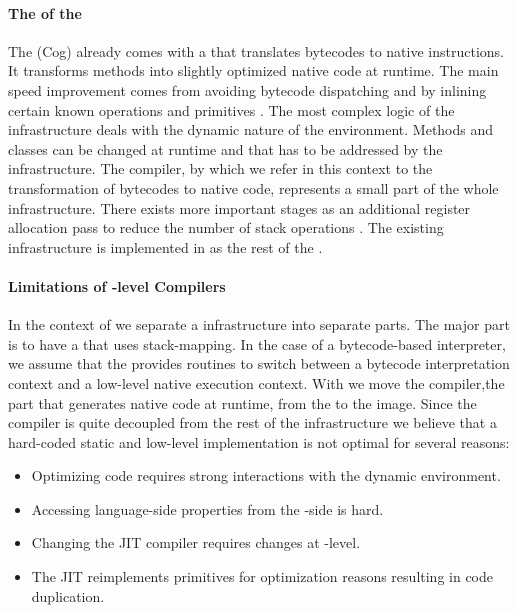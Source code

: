\paragraph{The \JIT of the \PH \VM}
The \PH \VM (Cog) already comes with a \JIT that translates bytecodes to native instructions.
It transforms \ST methods into slightly optimized native code at runtime.
The main speed improvement comes from avoiding bytecode dispatching and by inlining certain known operations and primitives \cite{Ayco03a}.
The most complex logic of the \JIT infrastructure deals with the dynamic nature of the \ST environment.
Methods and classes can be changed at runtime and that has to be addressed by the \JIT infrastructure.
The \JIT compiler, by which we refer in this context to the transformation of bytecodes to native code, represents a small part of the whole infrastructure.
There exists more important stages as an additional register allocation pass to reduce the number of stack operations \cite{Mira99a,Mira11a}.
The existing \JIT infrastructure is implemented in \Slang \cite[Ch.\ 5]{Blac09a} as the rest of the \VM.

\paragraph{Limitations of \VM-level \JIT Compilers}
In the context of \NBJ we separate a \JIT infrastructure into separate parts.
The major part is to have a \VM that uses stack-mapping.
In the case of a bytecode-based interpreter, we assume that the \VM provides routines to switch between a bytecode interpretation context and a low-level native execution context.
With \NBJ we move the \JIT compiler,the part that generates native code at runtime, from the \VM to the image.%
 Since the \JIT compiler is quite decoupled from the rest of the \JIT infrastructure we believe that a hard-coded static and low-level implementation is not optimal for several reasons:

\begin{itemize}
	\item Optimizing \ST code requires strong interactions with the dynamic environment.
	\item Accessing language-side properties from the \VM-side is hard.
	\item Changing the JIT compiler requires changes at \VM-level.
	\item The JIT reimplements primitives for optimization reasons resulting in code duplication.
\end{itemize}

